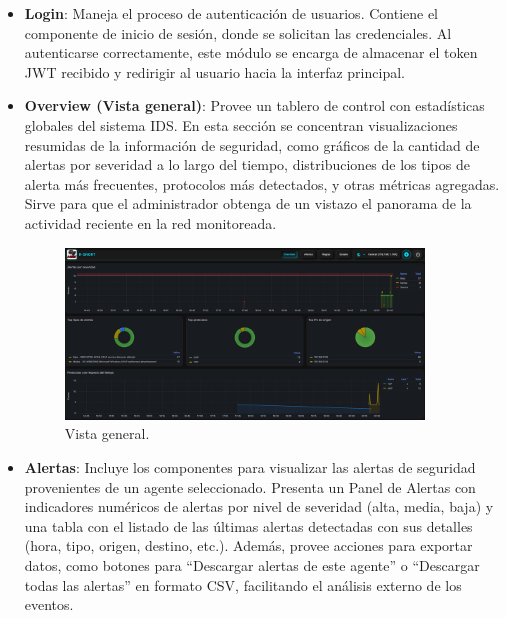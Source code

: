 \documentclass[11pt,a4paper,twoside]{report}
\begin{document}
\begin{itemize}
	\item \textbf{Login}: Maneja el proceso de autenticación de usuarios. Contiene el componente de inicio de sesión, donde se solicitan las credenciales. Al autenticarse correctamente, este módulo se encarga de almacenar el token JWT recibido y redirigir al usuario hacia la interfaz principal.
	
	\item \textbf{Overview (Vista general)}: Provee un tablero de control con estadísticas globales del sistema IDS. En esta sección se concentran visualizaciones resumidas de la información de seguridad, como gráficos de la cantidad de alertas por severidad a lo largo del tiempo, distribuciones de los tipos de alerta más frecuentes, protocolos más detectados, y otras métricas agregadas. Sirve para que el administrador obtenga de un vistazo el panorama de la actividad reciente en la red monitoreada.

	\begin{figure}[H]
		\centering
		\includegraphics[width=0.9\textwidth]{documento/overview.png}
		\caption{Vista general.}
		\label{fig:overview-frontend}
	\end{figure}
	
	\item \textbf{Alertas}: Incluye los componentes para visualizar las alertas de seguridad provenientes de un agente seleccionado. Presenta un Panel de Alertas con indicadores numéricos de alertas por nivel de severidad (alta, media, baja) y una tabla con el listado de las últimas alertas detectadas con sus detalles (hora, tipo, origen, destino, etc.). Además, provee acciones para exportar datos, como botones para ``Descargar alertas de este agente'' o ``Descargar todas las alertas'' en formato CSV, facilitando el análisis externo de los eventos.
	

\end{itemize}
\end{document}
